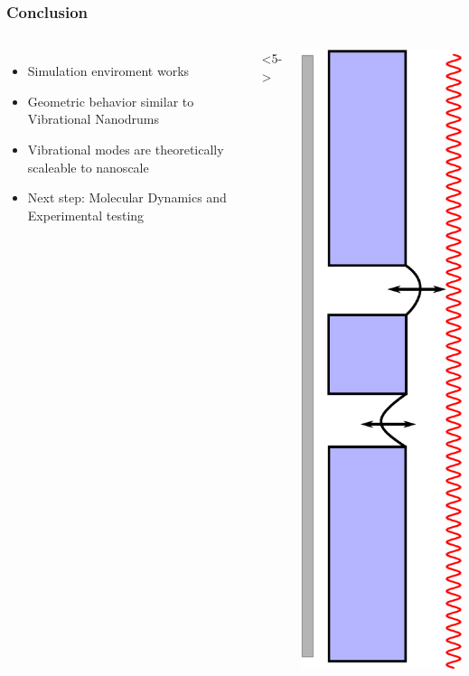 \documentclass[hyperref={colorlinks=true,urlcolor=blue,linkcolor=.},aspectratio=1610,mathserif]{beamer}
\begin{document}
\begin{frame}
 \frametitle{Conclusion}
 \begin{columns}[T]
  \begin{itemize}
   \item<2-> Simulation enviroment works
   \item<3-> Geometric behavior similar to Vibrational Nanodrums
   \item<4-> Vibrational modes are theoretically scaleable to nanoscale
   \item<5-> Next step: Molecular Dynamics and Experimental testing
  \end{itemize}
  <5->
  \begin{center}
   \includegraphics[height=0.6\textheight]{Figures/Fuck_dig_christoffer.eps}

\end{center}
\end{columns}
\end{frame}
\end{document}
